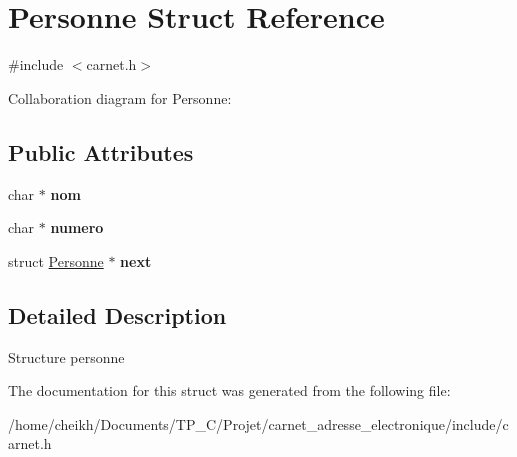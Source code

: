 \hypertarget{structPersonne}{}\section{Personne Struct Reference}
\label{structPersonne}


{\ttfamily \#include $<$carnet.\+h$>$}



Collaboration diagram for Personne\+:
\subsection*{Public Attributes}
\begin{DoxyCompactItemize}
\item 
\mbox{\label{structPersonne_a6a3ac48990128b8ceef49db33892eadc}} 
char $\ast$ {\bfseries nom}
\item 
\mbox{\label{structPersonne_a02ae4dc0e896130d2a36362b377314a3}} 
char $\ast$ {\bfseries numero}
\item 
\mbox{\label{structPersonne_a1d0f7276284ae28894cf2071c37a891c}} 
struct \hyperlink{structPersonne}{Personne} $\ast$ {\bfseries next}
\end{DoxyCompactItemize}


\subsection{Detailed Description}
Structure personne 

The documentation for this struct was generated from the following file\+:\begin{DoxyCompactItemize}
\item 
/home/cheikh/\+Documents/\+T\+P\+\_\+\+C/\+Projet/carnet\+\_\+adresse\+\_\+electronique/include/carnet.\+h\end{DoxyCompactItemize}
